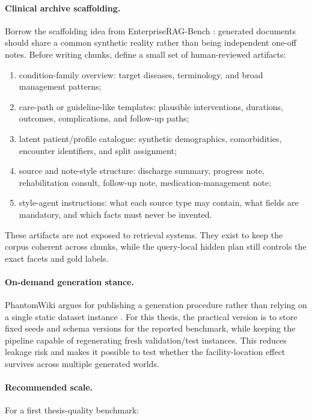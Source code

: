 \documentclass[11pt,a4paper]{article}
\begin{document}
\paragraph{Clinical archive scaffolding.}
Borrow the scaffolding idea from EnterpriseRAG-Bench \citep{sun2026enterpriseragbench}: generated documents should share a common synthetic reality rather than being independent one-off notes. Before writing chunks, define a small set of human-reviewed artifacts:

\begin{enumerate}[leftmargin=*]
	\item condition-family overview: target diseases, terminology, and broad management patterns;
	\item care-path or guideline-like templates: plausible interventions, durations, outcomes, complications, and follow-up paths;
	\item latent patient/profile catalogue: synthetic demographics, comorbidities, encounter identifiers, and split assignment;
	\item source and note-style structure: discharge summary, progress note, rehabilitation consult, follow-up note, medication-management note;
	\item style-agent instructions: what each source type may contain, what fields are mandatory, and which facts must never be invented.
\end{enumerate}

These artifacts are not exposed to retrieval systems. They exist to keep the corpus coherent across chunks, while the query-local hidden plan still controls the exact facets and gold labels.

\paragraph{On-demand generation stance.}
PhantomWiki argues for publishing a generation procedure rather than relying on a single static dataset instance \citep{gong2025phantomwiki}. For this thesis, the practical version is to store fixed seeds and schema versions for the reported benchmark, while keeping the pipeline capable of regenerating fresh validation/test instances. This reduces leakage risk and makes it possible to test whether the facility-location effect survives across multiple generated worlds.

\paragraph{Recommended scale.}
For a first thesis-quality benchmark:
\end{document}

